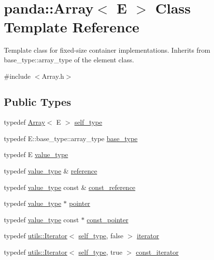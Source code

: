 \hypertarget{classpanda_1_1Array}{
\section{panda::Array$<$ E $>$ Class Template Reference}
\label{classpanda_1_1Array}
}


Template class for fixed-\/size container implementations. Inherits from base\_\-type::array\_\-type of the element class.  


{\ttfamily \#include $<$Array.h$>$}\subsection*{Public Types}
\begin{DoxyCompactItemize}
\item 
typedef \hyperlink{classpanda_1_1Array}{Array}$<$ E $>$ \hyperlink{classpanda_1_1Array_ad6bde3da7b6fdd2b20ae3c67973d6a33}{self\_\-type}
\item 
typedef E::base\_\-type::array\_\-type \hyperlink{classpanda_1_1Array_a3716c2dd4b92529bd7a9e8c94419e52d}{base\_\-type}
\item 
typedef E \hyperlink{classpanda_1_1Array_a1d3ff416a3960c4cb7a619df25d32359}{value\_\-type}
\item 
typedef \hyperlink{classpanda_1_1Array_a1d3ff416a3960c4cb7a619df25d32359}{value\_\-type} \& \hyperlink{classpanda_1_1Array_a87028232d5fb96ae20e58e1a92dfe708}{reference}
\item 
typedef \hyperlink{classpanda_1_1Array_a1d3ff416a3960c4cb7a619df25d32359}{value\_\-type} const \& \hyperlink{classpanda_1_1Array_a64dff4ee5d35a16425535f06c3e2b3e2}{const\_\-reference}
\item 
typedef \hyperlink{classpanda_1_1Array_a1d3ff416a3960c4cb7a619df25d32359}{value\_\-type} $\ast$ \hyperlink{classpanda_1_1Array_a14f428644ba37ca7a9d75760817e032d}{pointer}
\item 
typedef \hyperlink{classpanda_1_1Array_a1d3ff416a3960c4cb7a619df25d32359}{value\_\-type} const $\ast$ \hyperlink{classpanda_1_1Array_a3c3336e22b822441b731c248b272e8bb}{const\_\-pointer}
\item 
typedef \hyperlink{classpanda_1_1utils_1_1Iterator}{utils::Iterator}$<$ \hyperlink{classpanda_1_1Array}{self\_\-type}, false $>$ \hyperlink{classpanda_1_1Array_a74a060206264533305b6ab8729b0f85c}{iterator}
\item 
typedef \hyperlink{classpanda_1_1utils_1_1Iterator}{utils::Iterator}$<$ \hyperlink{classpanda_1_1Array}{self\_\-type}, true $>$ \hyperlink{classpanda_1_1Array_a4c0be76e73e13139fc0c132922f31323}{const\_\-iterator}
\end{DoxyCompactItemize}
